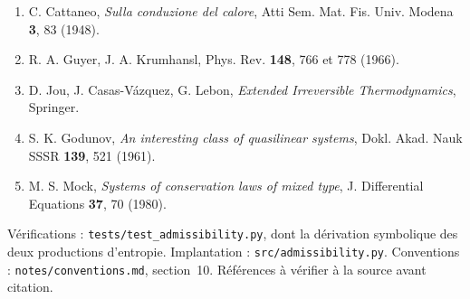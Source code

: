 \documentclass[11pt,a4paper]{article}
\begin{document}
{\small
\begin{enumerate}[leftmargin=1.6em,itemsep=0pt]
\item C. Cattaneo, \emph{Sulla conduzione del calore}, Atti Sem. Mat. Fis. Univ. Modena \textbf{3}, 83 (1948).
\item R. A. Guyer, J. A. Krumhansl, Phys. Rev. \textbf{148}, 766 et 778 (1966).
\item D. Jou, J. Casas-Vázquez, G. Lebon, \emph{Extended Irreversible Thermodynamics}, Springer.
\item S. K. Godunov, \emph{An interesting class of quasilinear systems}, Dokl. Akad. Nauk SSSR
\textbf{139}, 521 (1961).
\item M. S. Mock, \emph{Systems of conservation laws of mixed type}, J. Differential Equations
\textbf{37}, 70 (1980).
\end{enumerate}}

\vspace{4pt}
\noindent\small
Vérifications : \texttt{tests/\allowbreak test\_\allowbreak admissibility.py}, dont la dérivation symbolique des deux
productions d'entropie. Implantation : \texttt{src/\allowbreak admissibility.py}. Conventions :
\texttt{notes/\allowbreak conventions.md}, section~10. Références à vérifier à la source avant citation.
\end{document}
